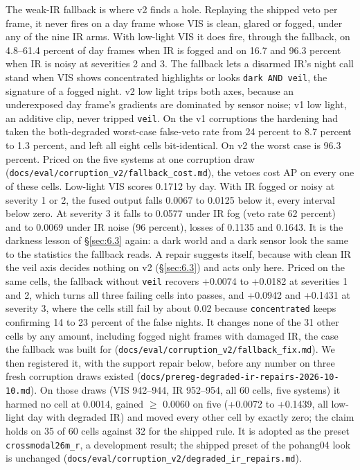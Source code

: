 \documentclass[10pt]{article}
\begin{document}
The weak-IR fallback is where v2 finds a hole. Replaying the shipped veto per frame, it never fires on a day frame whose VIS is clean, glared or fogged, under any of the nine IR arms. With low-light VIS it does fire, through the fallback, on 4.8--61.4 percent of day frames when IR is fogged and on 16.7 and 96.3 percent when IR is noisy at severities 2 and 3. The fallback lets a disarmed IR's night call stand when VIS shows concentrated highlights or looks \texttt{dark AND veil}, the signature of a fogged night. v2 low light trips both axes, because an underexposed day frame's gradients are dominated by sensor noise; v1 low light, an additive clip, never tripped \texttt{veil}. On the v1 corruptions the hardening had taken the both-degraded worst-case false-veto rate from 24 percent to 8.7 percent to 1.3 percent, and left all eight cells bit-identical. On v2 the worst case is 96.3 percent. Priced on the five systems at one corruption draw (\texttt{docs/\allowbreak{}eval/\allowbreak{}corruption\_\allowbreak{}v2/\allowbreak{}fallback\_\allowbreak{}cost.md}), the vetoes cost AP on every one of these cells. Low-light VIS scores 0.1712 by day. With IR fogged or noisy at severity 1 or 2, the fused output falls 0.0067 to 0.0125 below it, every interval below zero. At severity 3 it falls to 0.0577 under IR fog (veto rate 62 percent) and to 0.0069 under IR noise (96 percent), losses of 0.1135 and 0.1643. It is the darkness lesson of \S\ref{sec:6.3} again: a dark world and a dark sensor look the same to the statistics the fallback reads. A repair suggests itself, because with clean IR the veil axis decides nothing on v2 (\S\ref{sec:6.3}) and acts only here. Priced on the same cells, the fallback without \texttt{veil} recovers +0.0074 to +0.0182 at severities 1 and 2, which turns all three failing cells into passes, and +0.0942 and +0.1431 at severity 3, where the cells still fail by about 0.02 because \texttt{concentrated} keeps confirming 14 to 23 percent of the false nights. It changes none of the 31 other cells by any amount, including fogged night frames with damaged IR, the case the fallback was built for (\texttt{docs/\allowbreak{}eval/\allowbreak{}corruption\_\allowbreak{}v2/\allowbreak{}fallback\_\allowbreak{}fix.md}). We then registered it, with the support repair below, before any number on three fresh corruption draws existed (\texttt{docs/\allowbreak{}prereg-degraded-ir-repairs-2026-10-10.md}). On those draws (VIS 942--944, IR 952--954, all 60 cells, five systems) it harmed no cell at 0.0014, gained $\geq$ 0.0060 on five (+0.0072 to +0.1439, all low-light day with degraded IR) and moved every other cell by exactly zero; the claim holds on 35 of 60 cells against 32 for the shipped rule. It is adopted as the preset \texttt{crossmodal26m\_\allowbreak{}r}, a development result; the shipped preset of the pohang04 look is unchanged (\texttt{docs/\allowbreak{}eval/\allowbreak{}corruption\_\allowbreak{}v2/\allowbreak{}degraded\_\allowbreak{}ir\_\allowbreak{}repairs.md}).
\end{document}
